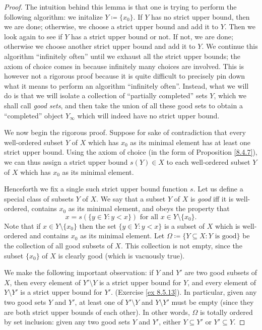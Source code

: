 \begin{proof}
    The intuition behind this lemma is that one is trying to perform the following algorithm:
    we initalize \(Y \coloneqq \{x_0\}\).
    If \(Y\) has no strict upper bound, then we are done;
    otherwise, we choose a strict upper bound and add it to \(Y\).
    Then we look again to see if \(Y\) has a strict upper bound or not.
    If not, we are done;
    otherwise we choose another strict upper bound and add it to \(Y\).
    We continue this algorithm ``infinitely often'' until we exhaust all the strict upper bounds;
    the axiom of choice comes in because infinitely many choices are involved.
    This is however not a rigorous proof because it is quite difficult to precisely pin down what it means to perform an algorithm ``infinitely often''.
    Instead, what we will do is that we will isolate a collection of ``partially completed'' sets \(Y\), which we shall call \emph{good sets}, and then take the union of all these good sets to obtain a ``completed'' object \(Y_{\infty}\) which will indeed have no strict upper bound.

    We now begin the rigorous proof.
    Suppose for sake of contradiction that every well-ordered subset \(Y\) of \(X\) which has \(x_0\) as its minimal element has at least one strict upper bound.
    Using the axiom of choice (in the form of Proposition \ref{8.4.7}), we can thus assign a strict upper bound \(s(Y) \in X\) to each well-ordered subset \(Y\) of \(X\) which has \(x_0\) as its minimal element.

    Henceforth we fix a single such strict upper bound function \(s\).
    Let us define a special class of subsets \(Y\) of \(X\).
    We say that a subset \(Y\) of \(X\) is \emph{good} iff it is well-ordered, contains \(x_0\) as its minimal element, and obeys the property that
    \[
        x = s(\{y \in Y : y < x\}) \text{ for all } x \in Y \setminus \{x_0\}.
    \]
    Note that if \(x \in Y \setminus \{x_0\}\) then the set \(\{y \in Y : y < x\}\) is a subset of \(X\) which is well-ordered and contains \(x_0\) as its minimal element.
    Let \(\Omega \coloneqq \{Y \subseteq X : Y \text{ is good}\}\) be the collection of all good subsets of \(X\).
    This collection is not empty, since the subset \(\{x_0\}\) of \(X\) is clearly good
    (which is vacuously true).

    We make the following important observation:
    if \(Y\) and \(Y'\) are two good subsets of \(X\), then every element of \(Y' \setminus Y\) is a strict upper bound for \(Y\), and every element of \(Y \setminus Y'\) is a strict upper bound for \(Y'\).
    (Exercise \ref{ex 8.5.13}).
    In particular, given any two good sets \(Y\) and \(Y'\), at least one of \(Y' \setminus Y\) and \(Y \setminus Y'\) must be empty
    (since they are both strict upper bounds of each other).
    In other words, \(\Omega\) is totally ordered by set inclusion:
    given any two good sets \(Y\) and \(Y'\), either \(Y \subseteq Y'\) or \(Y' \subseteq Y\).


\end{proof}
